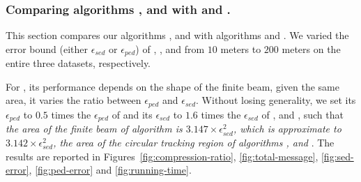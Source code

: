 {\subsubsection{Comparing algorithms \bitt, \sitt and \citt with \ldrh and \grts.}
This section compares our algorithms \citt, \sitt and \bitt with algorithms \ldrh and \grts.
We varied the error bound (either $\epsilon_{sed}$ or $\epsilon_{ped}$) of \citt, \sitt, \ldrh and \grts from $10$ meters to $200$ meters on the entire three datasets, respectively. 
{For \bitt, its performance depends on the shape of the finite beam, \ie given the same area, it varies \wrt the ratio between $\epsilon_{ped}$ and $\epsilon_{sed}$. {Without losing generality}, we set its $\epsilon_{ped}$ to {$0.5$} times the $\epsilon_{ped}$ of \sitt and its $\epsilon_{sed}$ to {$1.6$} times the $\epsilon_{sed}$ of \citt, \grts and \ldrh, such that \emph{the area of the finite beam of algorithm \bitt is $3.147\times\epsilon_{sed}^2$, which is approximate to $3.142\times\epsilon_{sed}^2$, the area of the circular tracking region of algorithms \ldrh, \grts and \citt}.
%
The results are reported in Figures~\ref{fig:compression-ratio}, \ref{fig:total-message}, \ref{fig:sed-error}, \ref{fig:ped-error} and \ref{fig:running-time}.


}}

